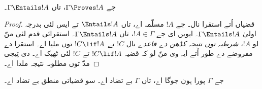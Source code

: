 \documentclass[../../../include/open-logic-section]{subfiles}
\begin{document}


\begin{thm}
جے $\Gamma\Proves!A$، تاں $\Gamma \Entails !A$۔
\end{thm}

\begin{proof}
قضیاں اُتے استقرا نال۔ جے $!A$ مسلّمہ اے، تاں $\Entails
!A$ تے ایس لئی بدرجہ اولیٰ $\Gamma \Entails!A$۔ ایویں ای جے $!A \in \Gamma$، تاں $\Gamma \Entails!A$۔ استقرائی قدم لئی منّ لو $!A$، \emph{شرطیہ توں نتیجہ کڈھن دے قاعدے} نال $!C$ تے $!C\lif!A$ توں ملیا اے۔ استقرا دے مفروضے دے طور اُتے ایہ وی منّ لو کہ قضیہ $!C\lif !A$ تے $!C$ لئی ٹھیک اے۔  دی تِیجی مدّ توں مطلوبہ نتیجہ ملدا اے۔
\end{proof}

\begin{cor}
جے $\Gamma$ پورا ہون جوگا اے، تاں $\Gamma$ بے تضاد اے۔ سو قضیاتی منطق بے تضاد اے۔
\end{cor}
\end{document}
